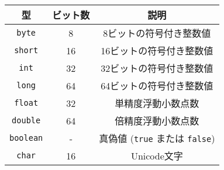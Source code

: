 \documentclass[a4paper]{ltjsreport}
\begin{document}
\begin{center}
  \begin{tabular}{|c|c|c|}
    \hline
    \textbf{型}      & \textbf{ビット数} & \textbf{説明}                                \\
    \hline
    \texttt{byte}    & 8                 & 8ビットの符号付き整数値                      \\
    \hline
    \texttt{short}   & 16                & 16ビットの符号付き整数値                     \\
    \hline
    \texttt{int}     & 32                & 32ビットの符号付き整数値                     \\
    \hline
    \texttt{long}    & 64                & 64ビットの符号付き整数値                     \\
    \hline
    \texttt{float}   & 32                & 単精度浮動小数点数                           \\
    \hline
    \texttt{double}  & 64                & 倍精度浮動小数点数                           \\
    \hline
    \texttt{boolean} & -                 & 真偽値 (\texttt{true} または \texttt{false}) \\
    \hline
    \texttt{char}    & 16                & Unicode文字                                  \\
    \hline
  \end{tabular}
\end{center}
\end{document}
